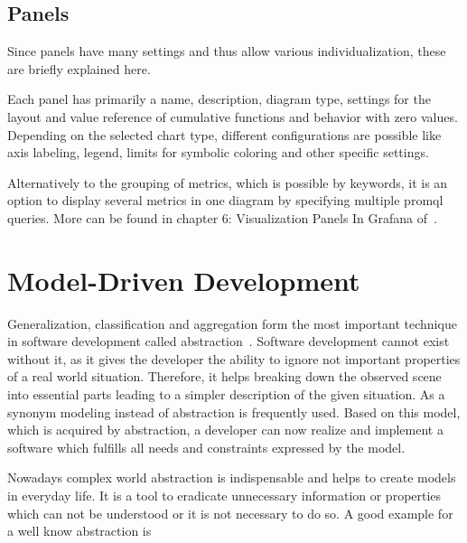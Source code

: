 \subsection{Panels}

Since panels have many settings and thus allow various individualization, these are briefly explained here.

Each panel has primarily a name, description, diagram type, settings for the layout and value reference of cumulative functions and behavior with zero values. Depending on the selected chart type, different configurations are possible like axis labeling, legend, limits for symbolic coloring and other specific settings.

Alternatively to the grouping of metrics, which is possible by keywords, it is an option to display several metrics in one diagram by specifying multiple \gls{promql} queries. More can be found in chapter 6: Visualization Panels In Grafana of~\cite{Salituro2020}.

\section{Model-Driven Development}

Generalization, classification and aggregation form the most important technique in software development called abstraction~\cite{Brambilla_2017}. Software development cannot exist without it, as it gives the developer the ability to ignore not important properties of a real world situation. Therefore, it helps breaking down the observed scene into essential parts leading to a simpler description of the given situation. As a synonym modeling instead of abstraction is frequently used. Based on this model, which is acquired by abstraction, a developer can now realize and implement a software which fulfills all needs and constraints expressed by the model. 

Nowadays complex world abstraction is indispensable and helps to create models in everyday life. It is a tool to eradicate unnecessary information or properties which can not be understood or it is not necessary to do so. 
A good example for a well know abstraction is 

